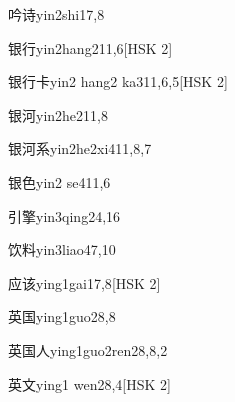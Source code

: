 \begin{entry}{吟诗}{yin2shi1}{7,8}
\end{entry}

\begin{entry}{银行}{yin2hang2}{11,6}[HSK 2]
\end{entry}

\begin{entry}{银行卡}{yin2 hang2 ka3}{11,6,5}[HSK 2]
\end{entry}

\begin{entry}{银河}{yin2he2}{11,8}
\end{entry}

\begin{entry}{银河系}{yin2he2xi4}{11,8,7}
\end{entry}

\begin{entry}{银色}{yin2 se4}{11,6}
\end{entry}

\begin{entry}{引擎}{yin3qing2}{4,16}
\end{entry}

\begin{entry}{饮料}{yin3liao4}{7,10}
\end{entry}

\begin{entry}{应该}{ying1gai1}{7,8}[HSK 2]
\end{entry}

\begin{entry}{英国}{ying1guo2}{8,8}
\end{entry}

\begin{entry}{英国人}{ying1guo2ren2}{8,8,2}
\end{entry}

\begin{entry}{英文}{ying1 wen2}{8,4}[HSK 2]
\end{entry}

